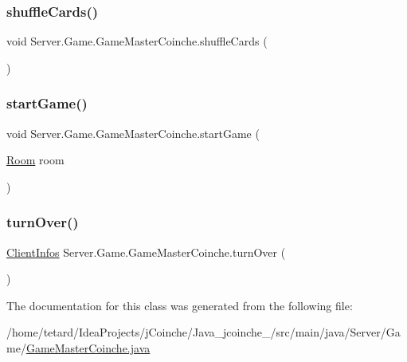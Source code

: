 \subsubsection{\texorpdfstring{shuffle\+Cards()}{shuffleCards()}}
{\footnotesize\ttfamily void Server.\+Game.\+Game\+Master\+Coinche.\+shuffle\+Cards (\begin{DoxyParamCaption}{ }\end{DoxyParamCaption})\hspace{0.3cm}{\ttfamily [inline]}}

\mbox{\label{classServer_1_1Game_1_1GameMasterCoinche_a7b7262936aafc0600b8a456e7bd6a82f}} 
\subsubsection{\texorpdfstring{start\+Game()}{startGame()}}
{\footnotesize\ttfamily void Server.\+Game.\+Game\+Master\+Coinche.\+start\+Game (\begin{DoxyParamCaption}\item[{\mbox{\hyperlink{classServer_1_1ServerConnexion_1_1Room}{Room}}}]{room }\end{DoxyParamCaption})\hspace{0.3cm}{\ttfamily [inline]}}

\mbox{\label{classServer_1_1Game_1_1GameMasterCoinche_a67214548e20a86dae287e8bf2c8a39d2}} 
\subsubsection{\texorpdfstring{turn\+Over()}{turnOver()}}
{\footnotesize\ttfamily \mbox{\hyperlink{classServer_1_1ServerConnexion_1_1ClientInfos}{Client\+Infos}} Server.\+Game.\+Game\+Master\+Coinche.\+turn\+Over (\begin{DoxyParamCaption}{ }\end{DoxyParamCaption})\hspace{0.3cm}{\ttfamily [inline]}}



The documentation for this class was generated from the following file\+:\begin{DoxyCompactItemize}
\item 
/home/tetard/\+Idea\+Projects/j\+Coinche/\+Java\+\_\+jcoinche\+\_/src/main/java/\+Server/\+Game/\mbox{\hyperlink{GameMasterCoinche_8java}{Game\+Master\+Coinche.\+java}}\end{DoxyCompactItemize}
